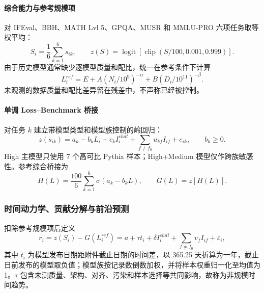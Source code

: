 \documentclass[bwprint]{gmcmthesis}
\numberwithin{equation}{section}
\numberwithin{figure}{section}
\numberwithin{table}{section}
\begin{document}
        \paragraph{综合能力与参考规模项}
        对 IFEval、BBH、MATH Lvl 5、GPQA、MUSR 和 MMLU-PRO 六项任务取等权平均：
        \begin{equation}
        S_i=\frac16\sum_{k=1}^{6}s_{ik},\qquad
        z(S)=\operatorname{logit}\!\left[\operatorname{clip}(S/100,0.001,0.999)\right].
        \label{eq:p4_score}
        \end{equation}
        由于历史模型通常缺少逐模型质量和配比，统一在参考条件下计算
        \begin{equation}
        L_i^{ref}=E+A(N_i/10^9)^{-\alpha}+B(D_i/10^{11})^{-\beta}.
        \label{eq:p4_reference_loss}
        \end{equation}
        未观测的数据质量和配比差异留在残差中，不声称已经被控制。

        \paragraph{单调 Loss--Benchmark 桥接}
        对任务 $k$ 建立带模型类型和模型族控制的岭回归：
        \begin{equation}
        z(s_{ik})=a_k-b_kL_i+c_kI_i^{chat}+\sum_{f\ne f_0}u_{kf}I_{if}+e_{ik},\qquad b_k\ge0.
        \label{eq:p4_bridge}
        \end{equation}
        High 主模型只使用 7 个高可比 Pythia 样本；High+Medium 模型仅作跨族敏感性。参考综合桥接为
        \begin{equation}
        H(L)=\frac{100}{6}\sum_{k=1}^{6}\sigma(a_k-b_kL),\qquad G(L)=z[H(L)].
        \label{eq:p4_bridge_function}
        \end{equation}

        \subsubsection{时间动力学、贡献分解与前沿预测}
        扣除参考规模项后定义
        \begin{equation}
        r_i=z(S_i)-G(L_i^{ref})
        =a+\tau t_i+\delta I_i^{chat}+\sum_{f\ne f_0}v_fI_{if}+\varepsilon_i,
        \label{eq:p4_dynamics}
        \end{equation}
        其中 $t_i$ 为模型发布日期距附件截止日期的时间差，以 365.25 天折算为一年，截止日前发布的模型取负值；模型族按记录数倒数加权，并将样本权重归一化至均值为 1。$\tau$ 包含未测质量、架构、对齐、污染和样本选择等共同影响，故称为非规模时间趋势。
\end{document}
